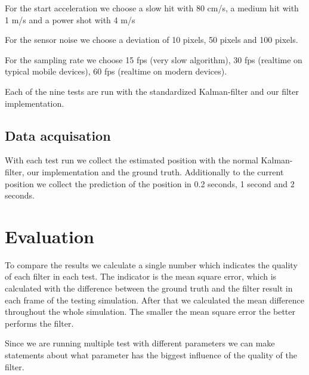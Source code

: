 \documentclass[12pt, letterpaper, twoside]{article}
\begin{document}
For the start acceleration we choose a slow hit with 80 cm/s, a medium hit with 1 m/s and a power shot with 4 m/s \cite{ballspeed}

For the sensor noise we choose a deviation of 10 pixels, 50 pixels and 100 pixels.

For the sampling rate we choose 15 fps (very slow algorithm), 30 fps (realtime on typical mobile devices), 60 fps (realtime on modern devices).

Each of the nine tests are run with the standardized Kalman-filter and our filter implementation.

\subsection{Data acquisation}

With each test run we collect the estimated position with the normal Kalman-filter, our implementation and the ground truth.
Additionally to the current position we collect the prediction of the position in 0.2 seconds, 1 second and 2 seconds.

\section{Evaluation}

To compare the results we calculate a single number which indicates the quality of each filter in each test.
The indicator is the mean square error, which is calculated with the difference between the ground truth and the filter result in each frame of the testing simulation.
After that we calculated the mean difference throughout the whole simulation.
The smaller the mean square error the better performs the filter.

Since we are running multiple test with different parameters we can make statements about what parameter has the biggest influence of the quality of the filter. 

 

\end{document}
